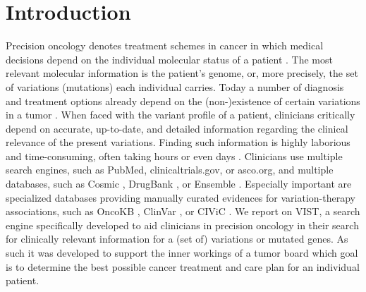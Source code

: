 \section*{Introduction}
Precision oncology denotes treatment schemes in cancer in which medical decisions depend on the individual molecular status of a patient \cite{Garraway2013}. 
The most relevant molecular information is the patient’s genome, or, more precisely, the set of variations (mutations) each individual carries. 
Today a number of diagnosis and treatment options already depend on the (non-)existence of certain variations in a tumor \cite{Topalian2016}. 
When faced with the variant profile of a patient, clinicians critically depend on accurate, up-to-date, and detailed information regarding the clinical relevance of the present variations. Finding such information is highly laborious and time-consuming, often taking hours or even days \cite{Doig2017}. 
Clinicians use multiple search engines, such as PubMed, clinicaltrials.gov, or asco.org, and multiple databases, such as Cosmic \cite{Forbes2015}, DrugBank \cite{Wishart2008}, or Ensemble \cite{Varadi2015}. 
Especially important are specialized databases providing manually curated evidences for variation-therapy associations, such as OncoKB \cite{Chakravarty2017}, ClinVar \cite{Landrum2016}, or CIViC \cite{Griffith2017}. 
We report on VIST, a search engine specifically developed to aid clinicians in precision oncology in their search for clinically relevant information for a (set of) variations or mutated genes. 
As such it was developed to support the inner workings of a tumor board which goal is to determine the best possible cancer treatment and care plan for an individual patient.
